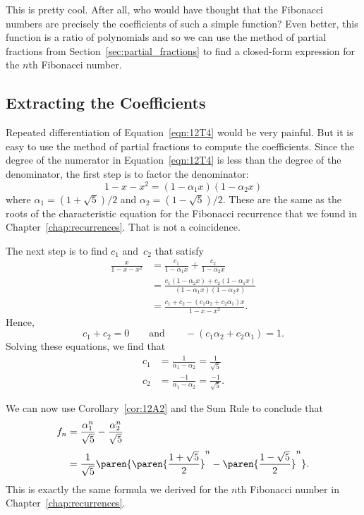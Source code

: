 This is pretty cool.  After all, who would have thought that the
Fibonacci numbers are precisely the coefficients of such a simple
function?  Even better, this function is a ratio of polynomials and so
we can use the method of partial fractions from
Section~\ref{sec:partial_fractions} to find a closed-form
expression for the $n$th Fibonacci number.

\subsection{Extracting the Coefficients}

Repeated differentiation of Equation~\ref{eqn:12T4} would be very
painful.  But it is easy to use the method of partial fractions to
compute the coefficients.  Since the degree of the numerator in
Equation~\ref{eqn:12T4} is less than the degree of the denominator,
the first step is to factor the denominator:
\begin{equation*}
    1 - x - x^2 = (1 - \alpha_1 x) (1 - \alpha_2 x)
\end{equation*}
where $\alpha_1 = (1 + \sqrt{5})/2$ and $\alpha_2 = (1 - \sqrt{5})/2$.
These are the same as the roots of the characteristic equation for the
Fibonacci recurrence that we found in Chapter~\ref{chap:recurrences}.
That is not a coincidence.

The next step is to find $c_1$ and~$c_2$ that satisfy
\begingroup
\openup 3pt
\begin{align*}
\frac{x}{1 - x - x^2}
    &= \frac{c_1}{1 - \alpha_1 x} + \frac{c_2}{1 - \alpha_2 x} \\
    &= \frac{c_1 (1 - \alpha_2 x) + c_2 (1 - \alpha_1 x)}
            {(1 - \alpha_1 x) (1 - \alpha_2 x)} \\
    &= \frac{c_1 + c_2 - (c_1 \alpha_2 + c_2 \alpha_1) x}
            {1 - x - x^2}.
\end{align*}
\endgroup
Hence,
\begin{equation*}
    c_1 + c_2 = 0
    \qquad\text{and}\qquad
    - (c_1 \alpha_2 + c_2 \alpha_1) = 1.
\end{equation*}
Solving these equations, we find that
\begin{align*}
    c_1 &= \frac{1}{\alpha_1 - \alpha_2} = \frac{1}{\sqrt{5}} \\
    c_2 &= \frac{-1}{\alpha_1 - \alpha_2} = \frac{-1}{\sqrt{5}}.
\end{align*}

We can now use Corollary~\ref{cor:12A2} and the Sum Rule to conclude
that
\begin{align*}
f_n &= \frac{\alpha_1^n}{\sqrt{5}} - \frac{\alpha_2^n}{\sqrt{5}} \\[3pt]
    &= \frac{1}{\sqrt{5}}
        \paren{
            \paren{\frac{1 + \sqrt{5}}{2}}^n - \paren{\frac{1 - \sqrt{5}}{2}}^n
        }.
\end{align*}
This is exactly the same formula we derived for the $n$th Fibonacci
number in Chapter~\ref{chap:recurrences}.

